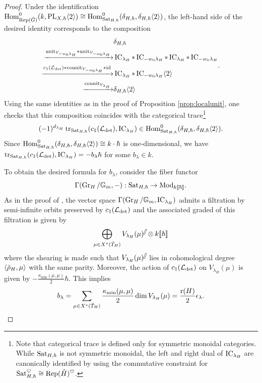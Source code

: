 \documentclass[reqno]{amsart}
\numberwithin{equation}{section}
\numberwithin{equation}{section}
\begin{document}
\begin{proof}
Under the identification $\operatorname{Hom}^0_{\operatorname{Rep}(\check{G})}(k, \mathrm{PL}_{X,\hbar}\langle 2\rangle)\cong \operatorname{Hom}^0_{\operatorname{Sat}_{H,\hbar}}(\delta_{H,\hbar},\delta_{H,\hbar}\langle 2\rangle)$, the left-hand side of the desired identity corresponds to the composition 
\begin{equation}
    \begin{split}
        & \delta_{H,\hbar} \\ 
        \xrightarrow{\mathrm{unit}_{V_{-w_0\lambda_H}}*\mathrm{unit}_{V_{-w_0\lambda_H}}} & \operatorname{IC}_{\lambda_H} * \operatorname{IC}_{-w_0\lambda_H} * \operatorname{IC}_{\lambda_H} * \operatorname{IC}_{-w_0\lambda_H} \\
        \xrightarrow{c_1(\mathcal{L}_{\det})*\mathrm{counit}_{V_{-w_0\lambda_H}}*\mathrm{id}} & \operatorname{IC}_{\lambda_H} * \operatorname{IC}_{-w_0\lambda_H} \langle 2\rangle \\
        \xrightarrow{\mathrm{counit}_{V_{\lambda_H}}} & \delta_{H,\hbar}\langle 2\rangle
    \end{split}
.\end{equation} Using the same identities as in the proof of Proposition \ref{prop:localunit}, one checks that this composition coincides with the categorical trace\footnote{Note that categorical trace is defined only for symmetric monoidal categories. While $\operatorname{Sat}_{H,\hbar}$ is not symmetric monoidal, the left and right dual of $\operatorname{IC}_{\lambda_H}$ are canonically identified by using the commutative constraint for $\operatorname{Sat}_{H,\hbar}^{\heartsuit}\cong \operatorname{Rep}(\check{H})^{\heartsuit}$.} \[(-1)^{d_{\lambda_H}}\operatorname{tr}_{\operatorname{Sat}_{H,\hbar}}(c_1(\mathcal{L}_{\det}),\operatorname{IC}_{\lambda_H})\in \operatorname{Hom}^0_{\operatorname{Sat}_{H,\hbar}}(\delta_{H,\hbar},\delta_{H,\hbar}\langle 2\rangle).\] Since $\operatorname{Hom}^0_{\operatorname{Sat}_{H,\hbar}}(\delta_{H,\hbar},\delta_{H,\hbar}\langle 2\rangle)\cong k\cdot \hbar$ is one-dimensional, we have $\operatorname{tr}_{\operatorname{Sat}_{H,\hbar}}(c_1(\mathcal{L}_{\det}),\operatorname{IC}_{\lambda_H})=-b_{\lambda}\hbar$ for some $b_{\lambda}\in k$.

To obtain the desired formula for $b_{\lambda}$, consider the fiber functor \[\Gamma(\operatorname{Gr}_H/\mathbb{G}_m,-):\operatorname{Sat}_{H,\hbar}\to \mathrm{Mod}_{k[\![\hbar]\!]}.\] As in the proof of \cite[Theorem\,4.4]{wang2026arithmeticvolumeshtukaslanglands}, the vector space $\Gamma(\operatorname{Gr}_H/\mathbb{G}_m,\operatorname{IC}_{\lambda_H})$ admits a filtration by semi-infinite orbits preserved by $c_1(\mathcal{L}_{\det})$ and the associated graded of this filtration is given by \[\bigoplus_{\mu\in X^*(\check{T}_H)}V_{\lambda_H}(\mu)^{{\mathbin{\mkern-6mu\fatslash}}}\otimes k[\![\hbar]\!]\] where the shearing is made such that $V_{\lambda_H}(\mu)^{{\mathbin{\mkern-6mu\fatslash}}}$ lies in cohomological degree $\langle \check{\rho}_H,\mu\rangle$ with the same parity. Moreover, the action of $c_1(\mathcal{L}_{\det})$ on $V_{\lambda_H}(\mu)$ is given by $-\frac{\kappa_{\min}(\mu,\mu)}{2}\hbar$. This implies \[b_{\lambda}=\sum_{\mu\in X^*(\check{T}_H)}\frac{\kappa_{\min}(\mu,\mu)}{2}\dim V_{\lambda_H}(\mu)=\frac{\operatorname{r}(H)}{2}\epsilon_{\lambda}.\]



\end{proof}
\end{document}
